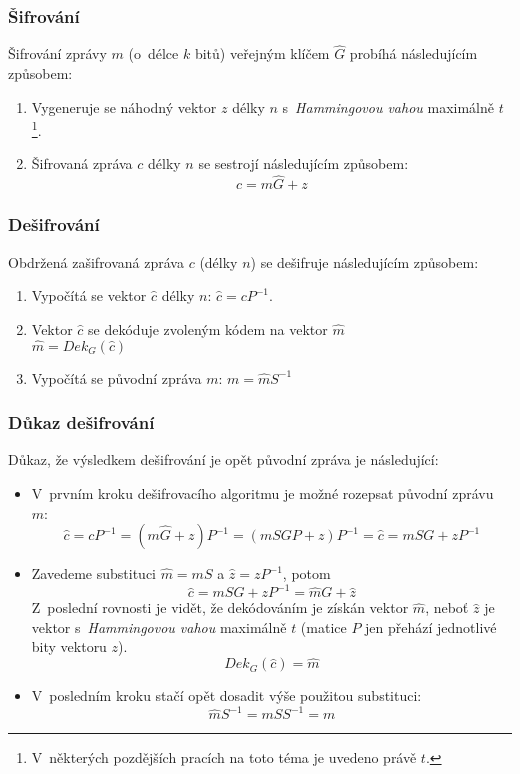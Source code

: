 \documentclass[thesis=M,czech,hidelinks]{FITthesis}[2012/06/26]
\newcommand{\0}{{\textcolor[gray]{0.80}{0}}}
\begin{document}
\subsubsection{Šifrování}
Šifrování zprávy $m$ (o~délce $k$ bitů) veřejným klíčem $\hat{G}$ probíhá
následujícím způsobem:

\begin{enumerate}
    \item Vygeneruje se náhodný vektor $z$ délky $n$ s~\emph{Hammingovou vahou}
        maximálně $t$\footnote{
            V~některých pozdějších pracích na toto téma je
            uvedeno právě $t$.
        }.
    \item Šifrovaná zpráva $c$ délky $n$ se sestrojí následujícím způsobem:
        $$ c = m \hat{G} + z$$
\end{enumerate}

\subsubsection{Dešifrování}
Obdržená zašifrovaná zpráva $c$ (délky $n$) se dešifruje následujícím způsobem:

\begin{enumerate}
    \item Vypočítá se vektor $\hat{c}$ délky $n$: $\hat{c} = c P^{-1}$.
    \item Vektor $\hat{c}$ se dekóduje zvoleným kódem na vektor $\hat{m}$ \\
        $\hat{m} = Dek_{G}\left(\hat{c}\right)$
    \item Vypočítá se původní zpráva $m$: $m = \hat{m} S^{-1}$
\end{enumerate}

\subsubsection{Důkaz dešifrování}\label{kap_dukaz_desifrovani}
Důkaz, že výsledkem dešifrování je opět původní zpráva je následující:

\begin{itemize}
    \item V~prvním kroku dešifrovacího algoritmu je možné rozepsat původní
        zprávu~$m$:
        $$ \hat{c} = c P^{-1} = \left( m \hat{G} + z \right) P^{-1} =
        \left(m S G P + z \right) P^{-1} = \hat{c} = m S G + z P^{-1} $$
    \item Zavedeme substituci $\hat{m} = m S$ a $\hat{z} = z P^{-1}$, potom
        $$ \hat{c} = m S G + z P^{-1} = \hat{m} G + \hat{z} $$
        Z~poslední rovnosti je vidět, že dekódováním je získán vektor $\hat{m}$,
        neboť $\hat{z}$ je vektor s~\emph{Hammingovou vahou} maximálně $t$
        (matice $P$ jen přehází jednotlivé bity vektoru $z$).
        $$ Dek_{G}\left(\hat{c}\right) = \hat{m} $$
    \item V~posledním kroku stačí opět dosadit výše použitou substituci:
        $$ \hat{m} S^{-1} = m S S^{-1} = m $$
\end{itemize}
\end{document}
